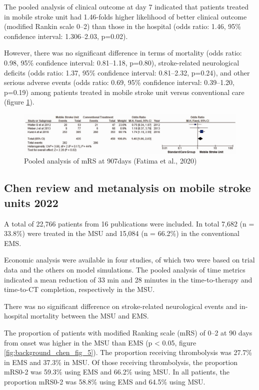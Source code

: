 The pooled analysis of clinical outcome at day 7 indicated that patients treated in mobile stroke unit had 1.46-folds higher likelihood of better clinical outcome (modified Rankin scale 0–2) than those in the hospital (odds ratio: 1.46, 95\% confidence interval: 1.306–2.03, p=0.02).

However, there was no significant difference in terms of mortality (odds ratio: 0.98, 95\% confidence interval: 0.81–1.18, p=0.80), stroke-related neurological deficits (odds ratio: 1.37, 95\% confidence interval: 0.81–2.32, p=0.24), and other serious adverse events (odds ratio: 0.69, 95\% confidence interval: 0.39–1.20, p=0.19) among patients treated in mobile stroke unit versus conventional care (figure \ref{fig:background_fatima_fig_5}).

\begin{figure}
    \centering
    \includegraphics[width=0.5\linewidth]{images_background/fatima_fig_5}
    \caption{Pooled analysis of mRS at 907days (Fatima et al., 2020)}
    \label{fig:background_fatima_fig_5}
\end{figure}


\subsection{Chen review and metanalysis on mobile stroke units 2022 \cite{chen_systematic_2022}}

A total of 22,766 patients from 16 publications were included. In total 7,682 (n = 33.8\%) were treated in the MSU and 15,084 (n = 66.2\%) in the conventional EMS.

Economic analysis were available in four studies, of which two were based on trial data and the others on model simulations. The pooled analysis of time metrics indicated a mean reduction of 33 min and 28 minutes in the time-to-therapy and time-to-CT completion, respectively in the MSU.

There was no significant difference on stroke-related neurological events and in-hospital mortality between the MSU and EMS.

The proportion of patients with modified Ranking scale (mRS) of 0–2 at 90 days from onset was higher in the MSU than EMS (p < 0.05, figure \ref{fig:background_chen_fig_5}). The proportion receiving thrombolysis was 27.7\% in EMS and 37.3\% in MSU. Of those receiving thrombolysis, the proportion mRS0-2 was 59.3\% using EMS and 66.2\% using MSU. In all patients, the proportion mRS0-2 was 58.8\% using EMS and 64.5\% using MSU.

